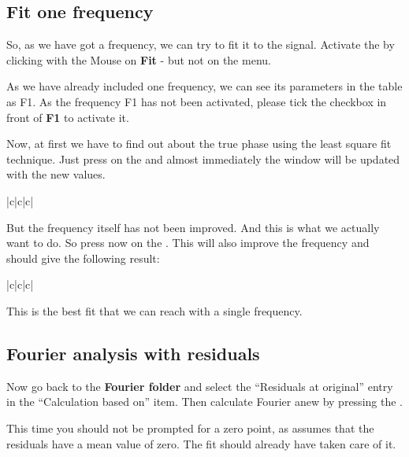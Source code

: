 \subsection{Fit one frequency}
So, as we have got a frequency, we can try to fit it to the signal.
Activate the  by clicking
with the Mouse on {\bf Fit} - but not on the menu.

As we have already included one frequency, 
we can see its parameters in the table as F1.
As the frequency F1 has not been activated,
please tick the checkbox in front of {\bf F1} to activate it.

Now, at first we have to find out about the true phase
using the least square fit technique.
Just press on the  and almost immediately
the window will be updated with the new values.

\begin{tabular}{|c|c|c|}\hline
{}\hline
{}
\hline\hline
{}
\end{tabular}

But the frequency itself has not been improved. 
And this is what we actually want to do.
So press now on the .
This will also improve the frequency and should give the
following result:

\begin{tabular}{|c|c|c|}\hline
{}\hline
{}
\hline\hline
{}
\end{tabular}

This is the best fit that we can reach with a single frequency.

\subsection{Fourier analysis with residuals}
Now go back to the {\bf Fourier folder} and
select the ``Residuals at original'' entry in the 
``Calculation based on'' item.
Then calculate Fourier anew by pressing the .

This time you should not be prompted for a zero point, as \period
assumes that the residuals have a mean value of zero. 
The fit should already have taken care of it.

